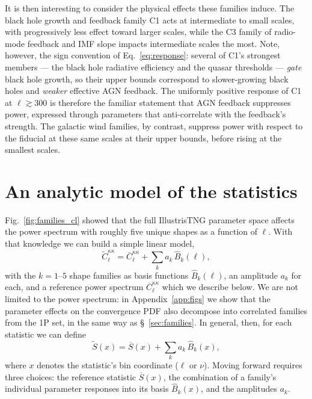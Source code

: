 \documentclass[linenumbers,trackchanges, twocolumn]{aastex701}
\begin{document}
It is then interesting to consider the physical effects these families induce. The black hole growth and feedback family C1 acts at intermediate to small scales, with progressively less effect toward larger scales, while the C3 family of radio-mode feedback and IMF slope impacts intermediate scales the most. Note, however, the sign convention of Eq.~\ref{eq:response}: several of C1's strongest members --- the black hole radiative efficiency and the quasar thresholds --- \emph{gate} black hole growth, so their upper bounds correspond to slower-growing black holes and \emph{weaker} effective AGN feedback. The uniformly positive response of C1 at $\ell \gtrsim 300$ is therefore the familiar statement that AGN feedback suppresses power, expressed through parameters that anti-correlate with the feedback's strength. The galactic wind families, by contrast, suppress power with respect to the fiducial at these same scales at their upper bounds, before rising at the smallest scales. 

 
\section{An analytic model of the statistics}\label{sec:emulator}
Fig.~\ref{fig:families_cl} showed that the full IllustrisTNG parameter space affects the power spectrum with roughly five unique shapes as a function of $\ell$. With that knowledge we can build a simple linear model,
\begin{equation}
\tilde{C}_\ell^{\kappa\kappa} = \overline{C}_\ell^{\kappa\kappa} + \sum_k a_k\, \hat{B}_k(\ell),
\end{equation}
with the $k = 1$--$5$ shape families as basis functions $\hat{B}_k(\ell)$, an amplitude $a_k$ for each, and a reference power spectrum $\overline{C}_\ell^{\kappa\kappa}$ which we describe below. We are not limited to the power spectrum: in Appendix~\ref{app:figs} we show that the parameter effects on the convergence PDF also decompose into correlated families from the 1P set, in the same way as \S~\ref{sec:families}. In general, then, for each statistic we can define
\begin{equation}\label{eq:analytic_model}
\tilde{S}(x) = \overline{S}(x) + \sum_k a_k\, \hat{B}_k(x),
\end{equation}
where $x$ denotes the statistic's bin coordinate ($\ell$ or $\nu$). Moving forward requires three choices: the reference statistic $\overline{S}(x)$, the combination of a family's individual parameter responses into its basis $\hat{B}_k(x)$, and the amplitudes $a_k$.
\end{document}
